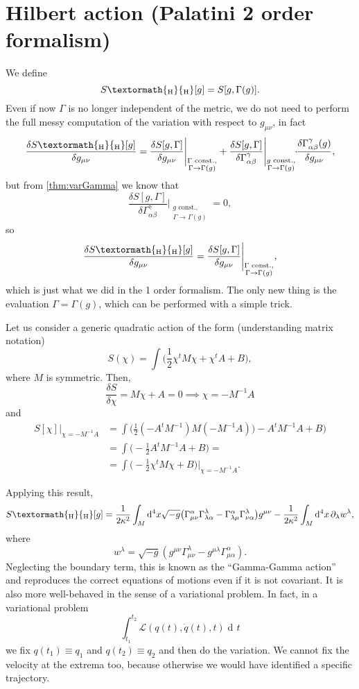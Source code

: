 \documentclass[a4paper,12pt]{book}
\newcommand{\ped}[1]{\textormath{\textsubscript{#1}}{_{\mathrm{#1}}}}
\newcommand{\ap}[1]{\textormath{\textsuperscript{#1}}{^{\mathrm{#1}}}}
\newcommand{\dd}{\mathop{\mathrm{d}\!}{}}
\theoremstyle{definition}
\theoremstyle{remark}
\let\oldcdot\cdot
\renewcommand{\cdot}{\! \oldcdot \!}
\begin{document}
\section{Hilbert action (Palatini 2\ap{nd} order formalism)}
We define
\[S\ped{H}[g]=S[g,\Gamma(g)].\]
Even if now $\Gamma$ is no longer independent of the metric, we do not need to perform the full messy computation of the variation with respect to $g_{\mu\nu}$, in fact
\[\frac{\delta S\ped{H}[g]}{\delta g_{\mu\nu}}=\frac{\delta S[g,\Gamma]}{\delta g_{\mu\nu}}\Bigg|_{\substack{\Gamma\text{ const.},\\ \Gamma\to\Gamma(g)}}+\frac{\delta S[g,\Gamma]}{\delta \Gamma^\gamma_{\alpha\beta}}\Bigg|_{\substack{g\text{ const.},\\ \Gamma\to\Gamma(g)}}\cdot\frac{\delta\Gamma^\gamma_{\alpha\beta}(g)}{\delta g_{\mu\nu}},\]
but from \cref{thm:varGamma} we know that
\[\frac{\delta S[g,\Gamma]}{\delta \Gamma^\gamma_{\alpha\beta}}\Bigg|_{\substack{g\text{ const.},\\ \Gamma\to\Gamma(g)}}=0,\]
so
\[\frac{\delta S\ped{H}[g]}{\delta g_{\mu\nu}}=\frac{\delta S[g,\Gamma]}{\delta g_{\mu\nu}}\Bigg|_{\substack{\Gamma\text{ const.},\\ \Gamma\to\Gamma(g)}},\]
which is just what we did in the 1\ap{st} order formalism. The only new thing is the evaluation $\Gamma=\Gamma(g)$, which can be performed with a simple trick.

Let us consider a generic quadratic action of the form (understanding matrix notation)
\[S(\chi)=\int\biggl(\frac12\chi^t M\chi+\chi^t A+B\biggr),\]
where $M$ is symmetric. Then,
\[\frac{\delta S}{\delta\chi}=M\chi+A=0\implies \chi=-M^{-1}A\]
and
\begin{align*}
S[\chi]\Big|_{\chi=-M^{-1}A}&=\int\biggl(\frac12(-A^tM^{-1})M(-M^{-1}A))-A^tM^{-1}A+B\biggr)\\
&=\int\biggl(-\frac12A^tM^{-1}A+B\biggr)=\\
&=\int\biggl(-\frac12\chi^tM\chi+B\biggr)\bigg|_{\chi=-M^{-1}A}.
\end{align*}

Applying this result,
\begin{align*}
S\ped{H}[g]=\frac1{2\kappa^2}\int_M\dd^4x\sqrt{-g}\bigl(\Gamma^\alpha_{\mu\nu}\Gamma^\lambda_{\lambda\alpha}-\Gamma^\alpha_{\lambda\mu}\Gamma^\lambda_{\nu\alpha}\bigr)g^{\mu\nu}-\frac1{2\kappa^2}\int_M\dd^4x\,\partial_\lambda w^\lambda,
\end{align*}
where
\[w^\lambda=\sqrt{-g}(g^{\mu\nu}\Gamma^\lambda_{\mu\nu}-g^{\mu\lambda}\Gamma^\alpha_{\mu\alpha}).\]
Neglecting the boundary term, this is known as the ``Gamma-Gamma action'' and reproduces the correct equations of motions even if it is not covariant. It is also more well-behaved in the sense of a variational problem. In fact, in a variational problem
\[\int_{t_1}^{t_2}\mathcal L(q(t),\dot q(t),t)\dd t\]
we fix $q(t_1)\equiv q_1$ and $q(t_2)\equiv q_2$ and then do the variation. We cannot fix the velocity at the extrema too, because otherwise we would have identified a specific trajectory.
\end{document}
